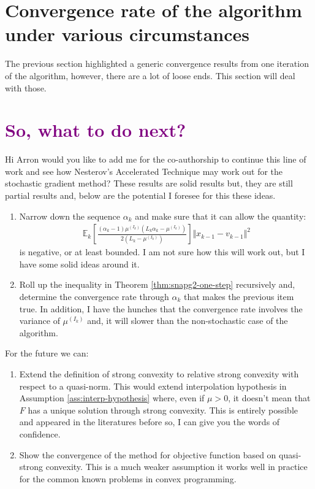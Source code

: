 \documentclass[12pt]{article}
\begin{document}
\section{Convergence rate of the algorithm under various circumstances}
    The previous section highlighted a generic convergence results from one iteration of the algorithm, however, there are a lot of loose ends. 
    This section will deal with those. 


\section{\textcolor{purple}{So, what to do next?}}
    Hi Arron would you like to add me for the co-authorship to continue this line of work and see how Nesterov's Accelerated Technique may work out for the stochastic gradient method? 
    These results are solid results but, they are still partial results and, below are the potential I foresee for this these ideas. 
    \begin{enumerate}
        \item Narrow down the sequence $\alpha_k$ and make sure that it can allow the quantity: 
        \begin{align*}
            \mathbb E_k\left[
                    \frac{(\alpha_k - 1)\mu^{(I_k)}\left(L_k\alpha_k - \mu^{(I_k)}\right)}{2\left(L_k - \mu^{(I_k)}\right)}
                \right]\Vert x_{k - 1} - v_{k - 1} \Vert^2
        \end{align*}
        is negative, or at least bounded. I am not sure how this will work out, but I have some solid ideas around it. 
        \item Roll up the inequality in Theorem \ref{thm:snapg2-one-step} recursively and, determine the convergence rate through $\alpha_k$ that makes the previous item true. 
        In addition, I have the hunches that the convergence rate involves the variance of $\mu^{(I_k)}$ and, it will slower than the non-stochastic case of the algorithm. 
    \end{enumerate}
    For the future we can: 
    \begin{enumerate}
        \item Extend the definition of strong convexity to relative strong convexity with respect to a quasi-norm. This would extend interpolation hypothesis in Assumption \ref{ass:interp-hypothesis} where, even if $\mu > 0$, it doesn't mean that $F$ has a unique solution through strong convexity. This is entirely possible and appeared in the literatures before so, I can give you the words of confidence. 
        \item Show the convergence of the method for objective function based on quasi-strong convexity. This is a much weaker assumption it works well in practice for the common known problems in convex programming. 
    \end{enumerate}




\end{document}
